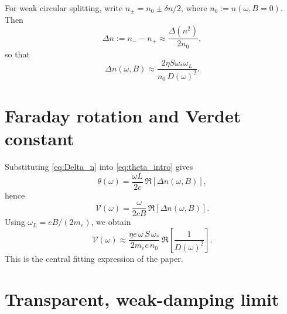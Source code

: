 \documentclass[11pt,a4paper]{article}
\begin{document}
        For weak circular splitting, write \(n_\pm=n_0\pm \delta n/2\), where \(n_0:=n(\omega,B=0)\). Then
        \begin{equation}
            \Delta n:=n_- - n_+ \approx \frac{\Delta(n^2)}{2n_0},
        \end{equation}
        so that
        \begin{equation}
            \boxed{
                \Delta n(\omega,B)
                \approx
                \frac{2\eta S\omega_\ast\omega_L}{n_0\,D(\omega)^2}
            }.
            \label{eq:Delta_n}
        \end{equation}
    
    \section{Faraday rotation and Verdet constant}
        
        Substituting \eqref{eq:Delta_n} into \eqref{eq:theta_intro} gives
        \begin{equation}
            \theta(\omega)=\frac{\omega L}{2c}\,\Re\!\left[\Delta n(\omega,B)\right],
        \end{equation}
        hence
        \begin{equation}
            \mathcal{V}(\omega)
            =
            \frac{\omega}{2cB}\,\Re\!\left[\Delta n(\omega,B)\right].
        \end{equation}
        Using \(\omega_L=eB/(2m_e)\), we obtain
        \begin{equation}
            \boxed{
                \mathcal{V}(\omega)
                \approx
                \frac{\eta e\,\omega\,S\,\omega_\ast}{2m_e c\,n_0}\,
                \Re\!\left[\frac{1}{D(\omega)^2}\right]
            }.
            \label{eq:Verdet_general}
        \end{equation}
        This is the central fitting expression of the paper.
    
    \section{Transparent, weak-damping limit}
        
\end{document}
